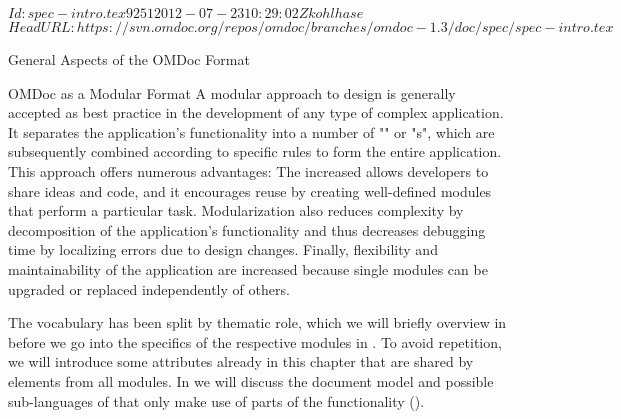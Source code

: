 \svnInfo $Id: spec-intro.tex 9251 2012-07-23 10:29:02Z kohlhase $
\svnKeyword $HeadURL: https://svn.omdoc.org/repos/omdoc/branches/omdoc-1.3/doc/spec/spec-intro.tex $
\begin{tchapter}[id=spec-intro]{General Aspects of the OMDoc Format}
\begin{tsection}[id=modular]{OMDoc as a Modular Format}
  A modular approach to design is generally accepted as best practice in the development
  of any type of complex application. It separates the application's functionality into a
  number of "{}" or "{s}", which are
  subsequently combined according to specific rules to form the entire application. This
  approach offers numerous advantages: The increased {}
  allows developers to share ideas and code, and it encourages reuse by creating
  well-defined modules that perform a particular task. Modularization also reduces
  complexity by decomposition of the application's functionality and thus decreases
  debugging time by localizing errors due to design changes. Finally, flexibility and
  maintainability of the application are increased because single modules can be upgraded
  or replaced independently of others.

  The {\omdoc} vocabulary has been split by thematic role, which we will briefly overview
  in {} before we go into the specifics of the respective modules
  in {}. To avoid repetition, we will introduce some attributes
  already in this chapter that are shared by elements from all modules. In
  {} we will discuss the {\omdoc} document model and possible
  sub-languages of {\omdoc} that only make use of parts of the functionality
  ().


\end{tsection}
\end{tchapter}
